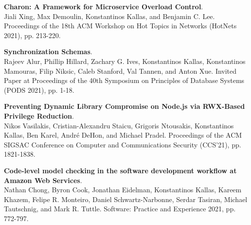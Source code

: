 \begin{minipage}{\textwidth}
\textbf{Charon: A Framework for Microservice Overload Control}. \\
Jiali Xing, Max Demoulin, Konstantinos Kallas, and Benjamin C. Lee.
Proceedings of the 18th ACM Workshop on Hot Topics in Networks (HotNets 2021), pp. 213-220. \\
\end{minipage}

\begin{minipage}{\textwidth}
\textbf{Synchronization Schemas}. \\
Rajeev Alur, Phillip Hillard, Zachary G. Ives, Konstantinos Kallas, Konstantinos Mamouras, Filip Niksic, Caleb Stanford, Val Tannen, and Anton Xue.
Invited Paper at Proceedings of the 40th Symposium on Principles of Database Systems (PODS 2021), pp. 1-18. \\
\end{minipage}



\begin{minipage}{\textwidth}
\textbf{Preventing Dynamic Library Compromise on Node.js via RWX-Based Privilege Reduction}. \\
Nikos Vasilakis, Cristian-Alexandru Staicu, Grigoris Ntousakis, Konstantinos Kallas, Ben Karel, André DeHon, and Michael Pradel.
Proceedings of the ACM SIGSAC Conference on Computer and Communications Security (CCS'21), pp. 1821-1838. \\
\end{minipage}

\begin{minipage}{\textwidth}
\textbf{Code-level model checking in the software development workflow at Amazon Web Services}. \\
Nathan Chong, Byron Cook, Jonathan Eidelman, Konstantinos Kallas, Kareem Khazem, Felipe R. Monteiro, Daniel Schwartz-Narbonne, Serdar Tasiran, Michael Tautschnig, and Mark R. Tuttle.
Software: Practice and Experience 2021, pp. 772-797. \\
\end{minipage}
    
